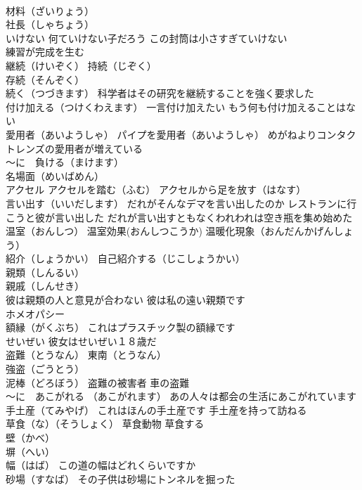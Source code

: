 \documentclass[8pt]{extreport}
\begin{document}
\begin{CJK}{UTF8}{min}
\\	材料（ざいりょう）
\\	社長（しゃちょう）
\\	いけない 何ていけない子だろう この封筒は小さすぎていけない
\\	練習が完成を生む
\\	継続（けいぞく） 持続（じぞく）
\\	存続（そんぞく）
\\	続く（つづきます） 科学者はその研究を継続することを強く要求した
\\	付け加える（つけくわえます） 一言付け加えたい もう何も付け加えることはない
\\	愛用者（あいようしゃ） パイプを愛用者（あいようしゃ） めがねよりコンタクトレンズの愛用者が増えている
\\	～に　負ける（まけます）
\\	名場面（めいばめん）
\\	アクセル アクセルを踏む（ふむ） アクセルから足を放す（はなす）
\\	言い出す（いいだします） だれがそんなデマを言い出したのか レストランに行こうと彼が言い出した だれが言い出すともなくわれわれは空き瓶を集め始めた
\\	温室（おんしつ） 温室効果(おんしつこうか) 温暖化現象（おんだんかげんしょう）
\\	紹介（しょうかい） 自己紹介する（じこしょうかい）
\\	親類（しんるい）
\\	親戚（しんせき）
\\	彼は親類の人と意見が合わない 彼は私の遠い親類です
\\	ホメオパシー
\\	額縁（がくぶち） これはプラスチック製の額縁です
\\	せいぜい 彼女はせいぜい１８歳だ
\\	盗難（とうなん） 東南（とうなん）
\\	強盗（ごうとう）
\\	泥棒（どろぼう） 盗難の被害者 車の盗難
\\	～に　あこがれる （あこがれます） あの人々は都会の生活にあこがれています
\\	手土産（てみやげ） これはほんの手土産です 手土産を持って訪ねる
\\	草食（な）（そうしょく） 草食動物 草食する
\\	壁（かべ）
\\	塀（へい）
\\	幅（はば） この道の幅はどれくらいですか
\\	砂場（すなば） その子供は砂場にトンネルを掘った

\end{CJK}
\end{document}
